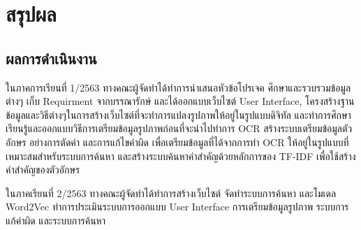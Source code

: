\chapter{สรุปผล}

\section{ผลการดำเนินงาน}
ในภาคการเรียนที่ 1/2563 ทางคณะผู้จัดทำได้ทำการนำเสนอหัวข้อโปรเจค ศึกษาและรวบรวมข้อมูลต่างๆ เก็บ Requirment จากบรรณารักษ์ และได้ออกแบบเว็บไซต์ User Interface, 
โครงสร้างฐานข้อมูลและวิธีต่างๆในการสร้างเว็บไซต์ที่จะทำการแปลงรูปภาพให้อยู่ในรูปแบบดิจิทัล 
และทำการศึกษา เรียนรู้และออกแบบวิธีการเตรียมข้อมูลรูปภาพก่อนที่จะนำไปทำการ OCR สร้างระบบเตรียมข้อมูลตัวอักษร อย่างการตัดคำ และการแก้ไขคำผิด เพื่อเตรียมข้อมูลที่ได้จากการทำ OCR 
ให้อยู่ในรูปแบบที่เหมาะสมสำหรับระบบการค้นหา และสร้างระบบค้นหาคำสำคัญด้วยหลักการของ TF-IDF เพื่อใช้สร้างคำสำคัญของตัวอักษร

ในภาคเรียนที่ 2/2563 ทางคณะผู้จัดทำได้ทำการสร้างเว็บไซต์ จัดทำระบบการค้นหา และโมเดล Word2Vec ทำการประเมินระบบการออกแบบ User Interface การเตรียมข้อมูลรูปภาพ ระบบการแก้คำผิด และระบบการค้นหา 

